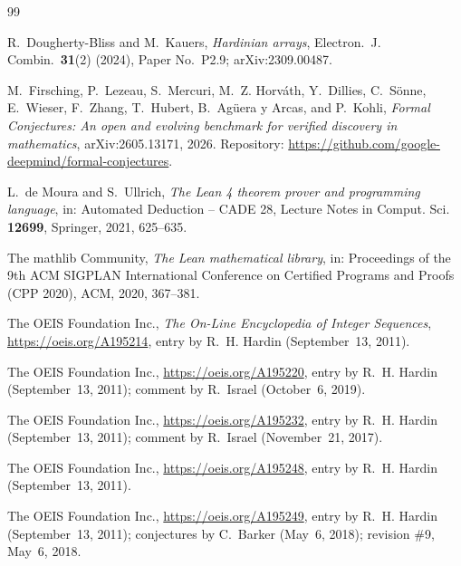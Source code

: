 \documentclass[11pt]{amsart}
\theoremstyle{plain}
\theoremstyle{definition}
\begin{document}
{\footnotesize
\begin{thebibliography}{99}

R.~Dougherty-Bliss and M.~Kauers, \emph{Hardinian arrays}, Electron.\ J. Combin.\ \textbf{31}(2) (2024), Paper No.~P2.9; arXiv:2309.00487.

M.~Firsching, P.~Lezeau, S.~Mercuri, M.~Z. Horv\'ath, Y.~Dillies, C.~S\"onne, E.~Wieser, F.~Zhang, T.~Hubert, B.~Ag\"uera y Arcas, and P.~Kohli, \emph{Formal Conjectures: An open and evolving benchmark for verified discovery in mathematics}, arXiv:2605.13171, 2026. Repository: \url{https://github.com/google-deepmind/formal-conjectures}.

L.~de Moura and S.~Ullrich, \emph{The Lean 4 theorem prover and programming language}, in: Automated Deduction -- CADE 28, Lecture Notes in Comput. Sci. \textbf{12699}, Springer, 2021, 625--635.

The mathlib Community, \emph{The Lean mathematical library}, in: Proceedings of the 9th ACM SIGPLAN International Conference on Certified Programs and Proofs (CPP 2020), ACM, 2020, 367--381.

The OEIS Foundation Inc., \emph{The On-Line Encyclopedia of Integer Sequences}, \url{https://oeis.org/A195214}, entry by R.~H. Hardin (September~13, 2011).

The OEIS Foundation Inc., \url{https://oeis.org/A195220}, entry by R.~H. Hardin (September~13, 2011); comment by R.~Israel (October~6, 2019).

The OEIS Foundation Inc., \url{https://oeis.org/A195232}, entry by R.~H. Hardin (September~13, 2011); comment by R.~Israel (November~21, 2017).

The OEIS Foundation Inc., \url{https://oeis.org/A195248}, entry by R.~H. Hardin (September~13, 2011).

The OEIS Foundation Inc., \url{https://oeis.org/A195249}, entry by R.~H. Hardin (September~13, 2011); conjectures by C.~Barker (May~6, 2018); revision \#9, May~6, 2018.

\end{thebibliography}
}
\end{document}
